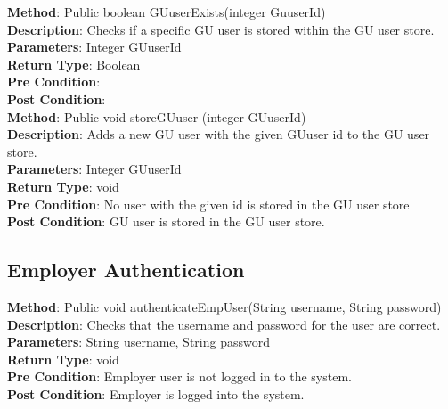 \documentclass{l3deliverable}
\begin{document}

\textbf{Method}: Public boolean GUuserExists(integer GuuserId)\\
\textbf{Description}: Checks if a specific GU user is stored within the GU user store.\\
\textbf{Parameters}: Integer GUuserId\\
\textbf{Return Type}: Boolean\\
\textbf{Pre Condition}:\\
\textbf{Post Condition}:\\

\textbf{Method}: Public void storeGUuser (integer GUuserId)\\
\textbf{Description}: Adds a new GU user with the given GUuser id to the GU user store.\\
\textbf{Parameters}: Integer GUuserId\\
\textbf{Return Type}: void\\
\textbf{Pre Condition}: No user with the given id is stored in the GU user store\\
\textbf{Post Condition}: GU user is stored in the GU user store.\\

\subsection{Employer Authentication}

\textbf{Method}: Public void authenticateEmpUser(String username, String password)\\
\textbf{Description}: Checks that the username and password for the user are correct.\\
\textbf{Parameters}: String username, String password\\
\textbf{Return Type}: void\\
\textbf{Pre Condition}: Employer user is not logged in to the system.\\
\textbf{Post Condition}: Employer is logged into the system.\\
\end{document}
